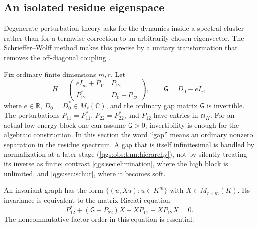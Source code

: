 \documentclass[11pt,oneside]{article}
\numberwithin{equation}{section}
\theoremstyle{plain}
\theoremstyle{definition}
\theoremstyle{remark}
\newcommand{\R}{\mathbb R}
\newcommand{\C}{\mathbb C}
\newcommand{\mm}{\mathfrak m}
\newcommand{\Gap}{\mathsf G}
\begin{document}
\subsection{An isolated residue eigenspace}
Degenerate perturbation theory asks for the dynamics inside a spectral cluster rather than for a termwise correction to an arbitrarily chosen eigenvector. The Schrieffer--Wolff method makes this precise by a unitary transformation that removes the off-diagonal coupling \cite{BDL}.

Fix ordinary finite dimensions $m,r$. Let
\begin{equation}\label{qgs:obs:eq:blockH}
 H=\begin{pmatrix} eI_m+P_{11}&P_{12}\\P_{12}^*&D_0+P_{22}\end{pmatrix},
 \qquad \Gap=D_0-eI_r,
\end{equation}
where $e\in\R$, $D_0=D_0^*\in M_r(\C)$, and the ordinary gap matrix $\Gap$ is invertible. The perturbations $P_{11}=P_{11}^*$, $P_{22}=P_{22}^*$, and $P_{12}$ have entries in $\mm_K$. For an actual low-energy block one can assume $\Gap>0$; invertibility is enough for the algebraic construction. In this section the word ``gap'' means an ordinary nonzero separation in the residue spectrum. A gap that is itself infinitesimal is handled by normalization at a later stage (\cref{qgs:obs:thm:hierarchy}), not by silently treating its inverse as finite; contrast \cref{qgs:sec:elimination}, where the high block is unlimited, and \cref{qgs:sec:schur}, where it becomes soft.

An invariant graph has the form $\{(u,Xu):u\in K^m\}$ with $X\in M_{r\times m}(K)$. Its invariance is equivalent to the matrix Riccati equation
\begin{equation}\label{qgs:obs:eq:riccati}
 P_{12}^*+(\Gap+P_{22})X-XP_{11}-XP_{12}X=0.
\end{equation}
The noncommutative factor order in this equation is essential.
\end{document}

